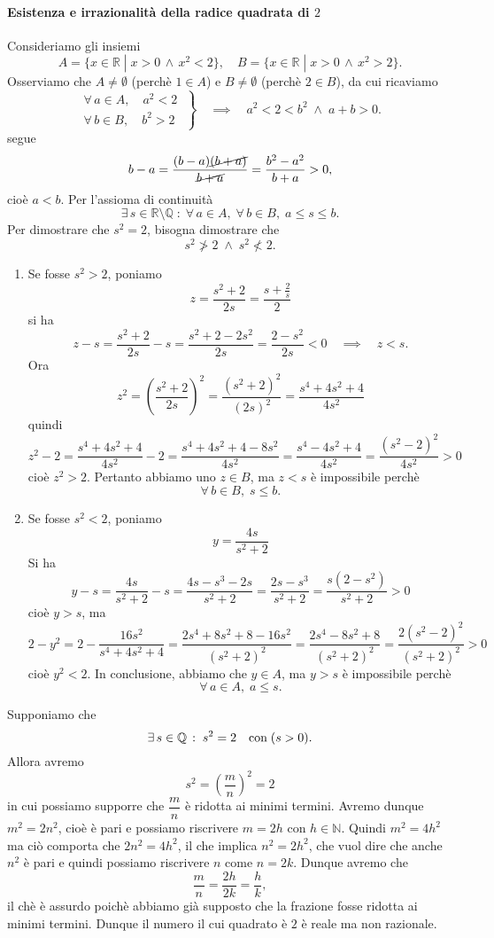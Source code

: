 \documentclass{article}
\theoremstyle{plain}
\theoremstyle{definition}
\theoremstyle{remark}
\begin{document}
\paragraph{Esistenza e irrazionalità della radice quadrata di $2$}
Consideriamo gli insiemi
\[ A=\{x\in\mathbb{R}\;|\;x>0\,\land\, x^2<2\},\quad B=\{x\in\mathbb{R}\;|\;x>0\,\land\, x^2>2\}. \]
Osserviamo che $A\neq\emptyset$ (perchè $1\in A$) e $B\neq\emptyset$ (perchè $2\in B$),
da cui ricaviamo 
\[\left.\begin{array}{l}
        \forall\,a\in A,\quad a^2 < 2\;\\
        \forall\,b\in B,\quad b^2 > 2
    \end{array}\right\}\quad\implies\quad a^2< 2 < b^2\;\land\;a+b>0.\]
segue
\[b-a=\dfrac{(b-a)\cancel{(b+a)}}{\cancel{b+a}}=\dfrac{b^2-a^2}{b+a}>0,\]
cioè $a<b$.
Per l'assioma di continuità 
\[\exists\, s\in\mathbb{R}\setminus\mathbb{Q}\; :\; \forall\, a\in A,\; \forall\, b\in B,\;a\leq s\leq b.\]
Per dimostrare che $s^2=2$, bisogna dimostrare che \[s^2\ngtr 2\;\land\; s^2\nless 2.\]
\begin{enumerate}
    \item Se fosse $s^2>2$, poniamo 
    \[z=\dfrac{s^2+2}{2s}=\dfrac{s+\frac{2}{s}}{2}\]
    si ha \[z-s=\dfrac{s^2+2}{2s}-s=\dfrac{s^2+2-2s^2}{2s}=\dfrac{2-s^2}{2s}<0\quad\implies\quad z<s.\]
    Ora \[z^2=\left(\dfrac{s^2+2}{2s}\right)^2=\dfrac{(s^2+2)^2}{(2s)^2}=\dfrac{s^4+4s^2+4}{4s^2}\]
    quindi \[z^2-2=\dfrac{s^4+4s^2+4}{4s^2}-2=\dfrac{s^4+4s^2+4-8s^2}{4s^2}=\dfrac{s^4-4s^2+4}{4s^2}=\dfrac{(s^2-2)^2}{4s^2}>0\]
    cioè $z^2>2$.
    Pertanto abbiamo uno $z\in B$, ma $z<s$ è impossibile perchè \[\forall\,b\in B,\; s\leq b.\]
    \item Se fosse $s^2<2$, poniamo 
    \[y=\dfrac{4s}{s^2+2}\]
    Si ha \[y-s=\dfrac{4s}{s^2+2}-s=\dfrac{4s-s^3-2s}{s^2+2}=\dfrac{2s-s^3}{s^2+2}=\dfrac{s(2-s^2)}{s^2+2}>0\]
    cioè $y>s$,
    ma 
    \[ 2-y^2=2-\dfrac{16s^2}{s^4+4s^2+4}=\dfrac{2s^4+8s^2+8-16s^2}{(s^2+2)^2}=\dfrac{2s^4-8s^2+8}{(s^2+2)^2}=\dfrac{2(s^2-2)^2}{(s^2+2)^2}>0 \]
    cioè $y^2<2$.
    In conclusione, abbiamo che $y\in A$, ma $y>s$ è impossibile perchè \[\forall\,a\in A,\;a\leq s.\]
\end{enumerate}
Supponiamo che 
\[\exists\, s\in\mathbb{Q}\,:\; s^2=2 \quad\textup{con}\;(s>0).\]
Allora avremo 
\[s^2=\left(\dfrac{m}{n}\right)^2=2\]
in cui possiamo supporre che $\dfrac{m}{n}$ è ridotta ai minimi termini.
Avremo dunque $m^2=2n^2$, cioè è pari e possiamo riscrivere $m=2h$ con $h\in\mathbb{N}$.
Quindi $m^2=4h^2$ ma ciò comporta che $2n^2=4h^2$, il che implica 
$n^2=2h^2$, che vuol dire che anche $n^2$ è pari e quindi possiamo riscrivere $n$ come $n=2k$.
Dunque avremo che \[\dfrac{m}{n}=\dfrac{2h}{2k}=\dfrac{h}{k},\]
il chè è assurdo poichè abbiamo già supposto che la frazione fosse ridotta ai minimi termini. 
Dunque il numero il cui quadrato è $2$ è reale ma non razionale.
\end{document}
